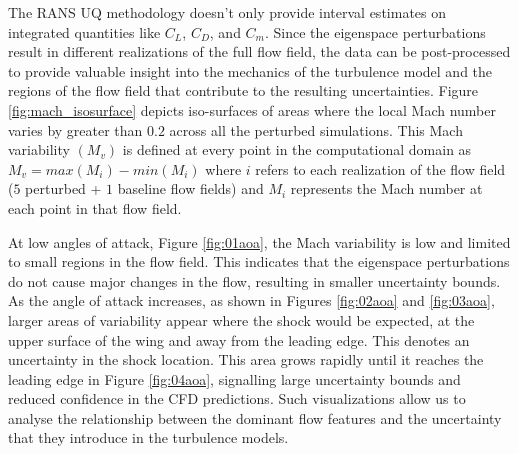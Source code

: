 The RANS UQ methodology doesn't only provide interval estimates on integrated quantities like $C_L$, $C_D$, and $C_m$. Since the eigenspace perturbations result in different realizations of the full flow field, the data can be post-processed to provide valuable insight into the mechanics of the turbulence model and the regions of the flow field that contribute to the resulting uncertainties. Figure \ref{fig:mach_isosurface} depicts iso-surfaces of areas where the local Mach number varies by greater than $0.2$ across all the perturbed simulations. This Mach variability $(M_v)$ is defined at every point in the computational domain as $M_v = max(M_i) - min(M_i)$ where $i$ refers to each realization of the flow field ($5$ perturbed + $1$ baseline flow fields) and $M_i$ represents the Mach number at each point in that flow field. 

At low angles of attack, Figure \ref{fig:01aoa}, the Mach variability is low and limited to small regions in the flow field. This indicates that the eigenspace perturbations do not cause major changes in the flow, resulting in smaller uncertainty bounds. As the angle of attack increases, as shown in Figures \ref{fig:02aoa} and \ref{fig:03aoa}, larger areas of variability appear where the shock would be expected, at the upper surface of the wing and away from the leading edge. This denotes an uncertainty in the shock location. This area grows rapidly until it reaches the leading edge in Figure \ref{fig:04aoa}, signalling large uncertainty bounds and reduced confidence in the CFD predictions. Such visualizations allow us to analyse the relationship between the dominant flow features and the uncertainty that they introduce in the turbulence models. 

